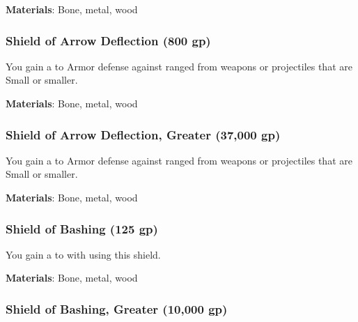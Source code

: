 \vspace{0.25em}
\textbf{Materials}: Bone, metal, wood


\lowercase{\hypertarget{item:Shield of Arrow Deflection}{}}\label{item:Shield of Arrow Deflection}
\hypertarget{item:Shield of Arrow Deflection}{\subsubsection{Shield of Arrow Deflection\hfill{} (800 gp)}}

You gain a   to Armor defense against ranged  from weapons or projectiles that are Small or smaller.



\vspace{0.25em}
\textbf{Materials}: Bone, metal, wood


\lowercase{\hypertarget{item:Shield of Arrow Deflection, Greater}{}}\label{item:Shield of Arrow Deflection, Greater}
\hypertarget{item:Shield of Arrow Deflection, Greater}{\subsubsection{Shield of Arrow Deflection, Greater\hfill{} (37,000 gp)}}

You gain a   to Armor defense against ranged  from weapons or projectiles that are Small or smaller.



\vspace{0.25em}
\textbf{Materials}: Bone, metal, wood


\lowercase{\hypertarget{item:Shield of Bashing}{}}\label{item:Shield of Bashing}
\hypertarget{item:Shield of Bashing}{\subsubsection{Shield of Bashing\hfill{} (125 gp)}}

You gain a   to  with  using this shield.



\vspace{0.25em}
\textbf{Materials}: Bone, metal, wood


\lowercase{\hypertarget{item:Shield of Bashing, Greater}{}}\label{item:Shield of Bashing, Greater}
\hypertarget{item:Shield of Bashing, Greater}{\subsubsection{Shield of Bashing, Greater\hfill{} (10,000 gp)}}

